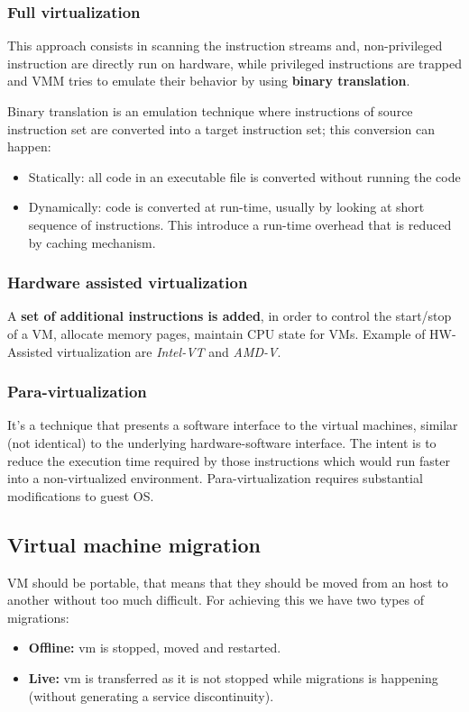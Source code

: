 \documentclass{article}
\begin{document}
\subsubsection{Full virtualization}
This approach consists in scanning the instruction streams and, non-privileged instruction are directly run on hardware, while privileged instructions are trapped and VMM tries to emulate their behavior by using \textbf{binary translation}.

Binary translation is an emulation technique where instructions of source instruction set are converted into a target instruction set; this conversion can happen:
\begin{itemize}
    \item Statically: all code in an executable file is converted without running the code
    \item Dynamically: code is converted at run-time, usually by looking at short sequence of instructions. This introduce a run-time overhead that is reduced by caching mechanism.
\end{itemize}

\subsubsection{Hardware assisted virtualization}
A \textbf{set of additional instructions is added}, in order to control the start/stop of a VM, allocate memory pages, maintain CPU state for VMs. Example of HW-Assisted virtualization are \textit{Intel-VT} and \textit{AMD-V}.

\subsubsection{Para-virtualization}
It's a technique that presents a software interface to the virtual machines, similar (not identical) to the underlying hardware-software interface. The intent is to reduce the execution time required by those instructions which would run faster into a non-virtualized environment. Para-virtualization requires substantial modifications to guest OS.

\subsection{Virtual machine migration}
VM should be portable, that means that they should be moved from an host to another without too much difficult. For achieving this we have two types of migrations:
\begin{itemize}
    \item \textbf{Offline:} vm is stopped, moved and restarted.
    \item \textbf{Live:} vm is transferred as it is not stopped while migrations is happening (without generating a service discontinuity).
\end{itemize}
\end{document}
